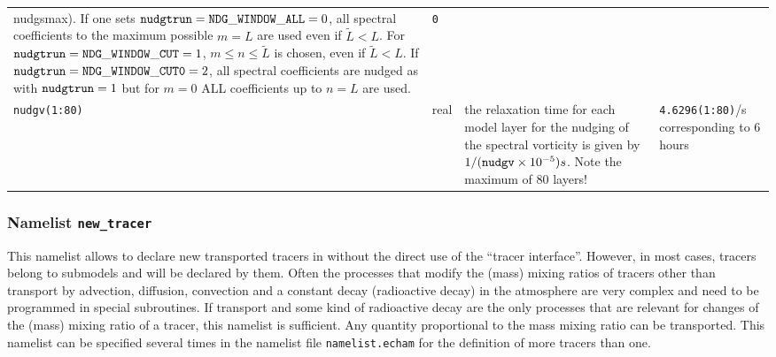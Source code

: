 \begin{longtable}{l@{\extracolsep\fill}lp{7cm}p{3.5cm}}
{    nudgsmax}). If one
  sets ${\tt nudgtrun}={\tt
    NDG\_WINDOW\_ALL}=0$, all spectral coefficients to the
  maximum possible $m=L$ are used even if $\tilde{L}<L$. For ${\tt
    nudgtrun}={\tt NDG\_WINDOW\_CUT}=1$, $m\le n\le\tilde{L}$ is
  chosen, even if $\tilde{L}<L$. If ${\tt nudgtrun}={\tt
    NDG\_WINDOW\_CUT0}=2$, all spectral coefficients are nudged as
  with ${\tt nudgtrun}=1$ but for $m=0$ ALL coefficients up to $n=L$
  are used. & {\tt 0}\\
{\tt nudgv(1:80)}\index{namelist variables!nudgv}
 & real & the relaxation time for each model layer
 for the nudging of the spectral vorticity is given by $1/({\tt
   nudgv}\times 10^{-5})s$. Note the maximum of 80
 layers! & {\tt 4.6296(1:80)}/s
 corresponding to 6 hours\\ \hline
\end{longtable}

\subsubsection{Namelist {\tt new\_tracer}}

This namelist allows to declare new transported tracers in \echam{}
without the direct use of the ``tracer interface''.
However, in most cases, tracers belong to submodels and will be declared by
them. Often the processes that modify the (mass) mixing ratios of
tracers other than transport by advection, diffusion, convection
and a constant decay (radioactive decay) in the atmosphere are very
complex and need to be programmed in special subroutines. If
transport and some kind of radioactive decay are the only processes
that are relevant for changes of the (mass) mixing ratio of a tracer,
this namelist is sufficient. Any quantity proportional to the mass
mixing ratio can be transported. This namelist can be specified
several times in the namelist file {\tt namelist.echam} for the
definition of more tracers than one.

\setlength{\LTcapwidth}{\textwidth}
\setlength{\LTleft}{0pt}\setlength{\LTright}{0pt}

